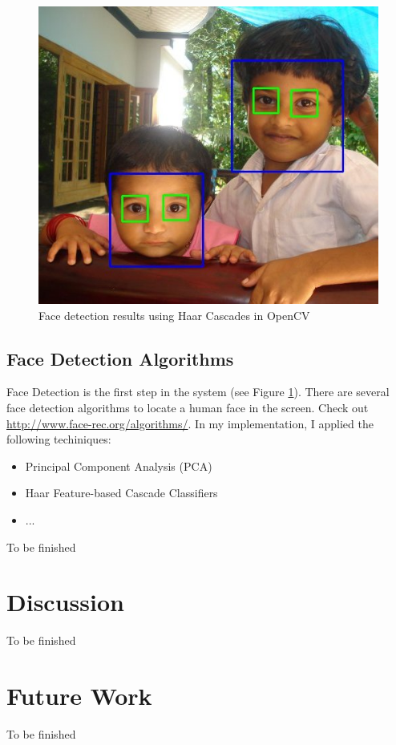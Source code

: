 \documentclass{sigchi}
\begin{document}
\begin{figure}[b]
    \centering
    \includegraphics[width=0.9\columnwidth]{figures/facedetection}
    \caption{Face detection results using Haar Cascades in OpenCV}
    \label{fig:fig2}
\end{figure}

\subsection{Face Detection Algorithms}
Face Detection is the first step in the system (see Figure \ref{fig:fig2}).
There are several face detection algorithms to locate a human face in the screen.
Check out {\url {http://www.face-rec.org/algorithms/}}.
In my implementation, I applied the following techiniques:

\begin{itemize}
\setlength\itemsep{-0.2em}
\item {Principal Component Analysis (PCA)}
\item {Haar Feature-based Cascade Classifiers}
\item {...}
\end{itemize}

To be finished


\section{Discussion}

To be finished

\section{Future Work}

To be finished

\balance{}



\end{document}
